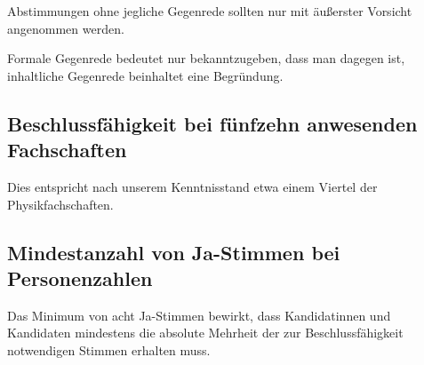 \documentclass[draft,12pt,oneside]{scrreprt}
\begin{document}
Abstimmungen ohne jegliche Gegenrede sollten nur mit äußerster Vorsicht
angenommen werden.

Formale Gegenrede bedeutet nur bekanntzugeben, dass man dagegen ist, inhaltliche
Gegenrede beinhaltet eine Begründung.

\subsection*{Beschlussfähigkeit bei fünfzehn anwesenden Fachschaften}

Dies entspricht nach unserem Kenntnisstand etwa einem Viertel der Physikfachschaften.

\subsection*{Mindestanzahl von Ja-Stimmen bei Personenzahlen}

Das Minimum von acht Ja-Stimmen bewirkt, dass Kandidatinnen und Kandidaten
mindestens die absolute Mehrheit der zur Beschlussfähigkeit notwendigen Stimmen
erhalten muss.
\end{document}
